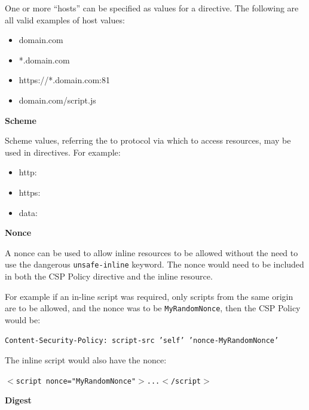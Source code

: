 \documentclass{mscreport}
\begin{document}
\vspace{0.3cm} \noindent
One or more ``hosts'' can be specified as values for a directive. The following are all valid examples of host values:
\begin{itemize}
  \setlength\itemsep{0.1em}
  \item domain.com
  \item *.domain.com
  \item https://*.domain.com:81
  \item domain.com/script.js
\end{itemize}

\vspace{0.5cm} \noindent
\textbf{Scheme}

\vspace{0.3cm} \noindent
Scheme values, referring the to protocol via which to access resources, may be used in directives. For example:

\begin{itemize}
  \setlength\itemsep{0.1em}
  \item http:
  \item https:
  \item data:
\end{itemize}

\vspace{0.5cm} \noindent
\textbf{Nonce}

\vspace{0.3cm} \noindent
A nonce can be used to allow inline resources to be allowed without the need to use the dangerous \texttt{unsafe-inline} keyword. The nonce would need to be included in both the CSP Policy directive and the inline resource.

\vspace{0.3cm} \noindent
For example if an in-line script was required, only scripts from the same origin are to be allowed, and the nonce was to be \texttt{MyRandomNonce}, then the CSP Policy would be:

\vspace{0.3cm} \noindent
\texttt{Content-Security-Policy: script-src 'self' 'nonce-MyRandomNonce'}

\vspace{0.3cm} \noindent
The inline script would also have the nonce:

\vspace{0.3cm} \noindent
\texttt{$<$script nonce="MyRandomNonce"$>$...$<$/script$>$}

\vspace{0.7cm} \noindent
\textbf{Digest}
\end{document}
